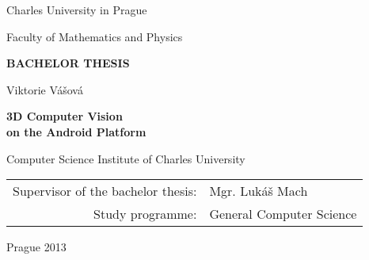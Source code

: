 \documentclass[12pt,a4paper]{report}
\begin{document}


\pagestyle{empty}
\begin{center}

\large

Charles University in Prague

\medskip

Faculty of Mathematics and Physics

\vfill

{\bf\Large BACHELOR THESIS}

\vfill


\vfill
\vspace{5mm}

{\LARGE Viktorie Vášová}

\vspace{15mm}

{\LARGE\bfseries 3D Computer Vision \\ on the Android Platform}

\vfill

Computer Science Institute of Charles University

\vfill

\begin{tabular}{rl}

Supervisor of the bachelor thesis: & Mgr. Lukáš Mach \\
\noalign{\vspace{2mm}}
Study programme: & General Computer Science \\
\end{tabular}

\vfill

Prague 2013

\end{center}

\newpage

\end{document}

